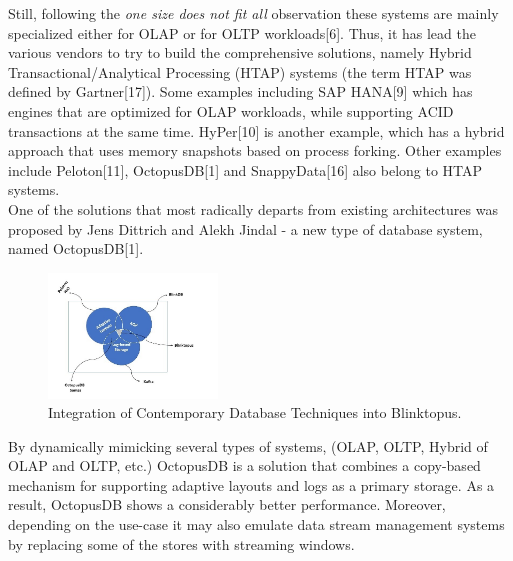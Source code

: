 \documentclass[10pt, conference, compsocconf]{IEEEtran}
\begin{document}
Still, following the \textit{one size does not fit all} observation these systems are mainly specialized either for OLAP or for OLTP workloads[6]. Thus, it has lead the various vendors to try to build the comprehensive solutions, namely Hybrid Transactional/Analytical Processing (HTAP) systems (the term HTAP was defined by Gartner[17]). Some examples including SAP HANA[9] which has engines that are optimized for OLAP workloads, while supporting ACID transactions at the same time. HyPer[10] is another example, which has a hybrid approach that uses memory snapshots based on process forking. Other examples include Peloton[11], OctopusDB[1] and  SnappyData[16] also belong to HTAP systems.  \\
One of the solutions that most radically departs from existing architectures was proposed by Jens Dittrich and Alekh Jindal - a new type of database system, named OctopusDB[1].
\begin{figure} \includegraphics[width=0.4\textwidth, center]{img/htap.png} 
\caption{Integration of Contemporary Database Techniques into Blinktopus.}
\end{figure}
By dynamically mimicking several types of systems, (OLAP, OLTP, Hybrid of OLAP and OLTP, etc.) OctopusDB is a solution that combines a copy-based mechanism for supporting adaptive layouts and logs as a primary storage. As a result, OctopusDB shows a considerably better performance. Moreover, depending on the use-case it may also emulate data stream management systems by replacing some of the stores with streaming windows. 
\end{document}
